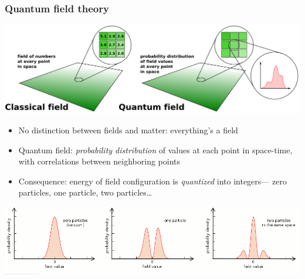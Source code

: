 \documentclass[compress]{beamer}
\begin{document}
\begin{frame}
\frametitle{Quantum field theory}
\begin{center}
\includegraphics[width=0.9\linewidth]{classical_quantum_fields.png}
\end{center}

\begin{itemize}
\item No distinction between fields and matter: everything's a field

\item Quantum field: {\it probability distribution} of values at each
  point in space-time, with correlations between neighboring points

\item Consequence: energy of field configuration is {\it quantized} into
  integers--- zero particles, one particle, two particles\ldots
\end{itemize}

\includegraphics[width=\linewidth]{fieldvalues.png}
\end{frame}
\end{document}
